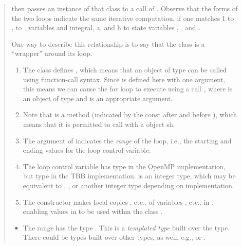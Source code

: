 \documentclass[letterpaper,10pt,openany,oneside]{sphinxmanual}
\begin{document}
\begin{quote}
\begin{description}
\begin{itemize}
then passes an instance of that class  to a call of . Observe that the forms of the two loops indicate the same iterative computation, if one      matches 1 to ,  to , variables and integral, a, and h to  state variables , , and .

One way to describe this relationship is to say that the class  is a ``wrapper''       around its loop.
\begin{enumerate}
\item {} 
The class  defines , which means that an object of type  can be called using function-call syntax. Since  is defined here with one argument, this means we can cause the for loop to execute using a call , where  is an object of type  and  is an appropriate argument.

\item {} 
Note that  is a  method (indicated by the const after \code{)} and before \code{\{} ), which means that it is permitted to call  with a  object sh.

\item {} 
The argument  of  indicates the \emph{range} of the loop, i.e., the starting and ending values for the loop control variable.

\item {} 
The loop control variable  has type  in the OpenMP implementation, but type  in the TBB implementation.  is an integer type, which may be equivalent to , , or another integer type depending on implementation.

\item {} 
The constructor  makes local copies , etc., of variables , etc., in , enabling values in  to be used within the class .

\end{enumerate}
\begin{itemize}
\item {} 
The range  has the type . This is a \emph{templated type} built over the  type. There could be  types built over other types, as well, e.g.,  or .


\end{itemize}
\end{itemize}
\end{description}
\end{quote}
\end{document}
